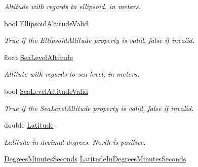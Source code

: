 \begin{DoxyCompactItemize}
\begin{DoxyCompactList}\small\item\em Altitude with regards to ellipsoid, in meters. \item\end{DoxyCompactList}\item 
bool \hyperlink{class_g_p_s_mobile_1_1_gps_position_aed0b8f9f01766832588f42446cef6208}{EllipsoidAltitudeValid}
\begin{DoxyCompactList}\small\item\em True if the EllipsoidAltitude property is valid, false if invalid. \item\end{DoxyCompactList}\item 
float \hyperlink{class_g_p_s_mobile_1_1_gps_position_a132616cda8bc6677dc7cdc22bf4a0c79}{SeaLevelAltitude}
\begin{DoxyCompactList}\small\item\em Altitute with regards to sea level, in meters. \item\end{DoxyCompactList}\item 
bool \hyperlink{class_g_p_s_mobile_1_1_gps_position_aae4f11b97d318dd8d6a67dba91eabb5e}{SeaLevelAltitudeValid}
\begin{DoxyCompactList}\small\item\em True if the SeaLevelAltitude property is valid, false if invalid. \item\end{DoxyCompactList}\item 
double \hyperlink{class_g_p_s_mobile_1_1_gps_position_a165e63838ebfe0e712c142f7a757dad6}{Latitude}
\begin{DoxyCompactList}\small\item\em Latitude in decimal degrees. North is positive. \item\end{DoxyCompactList}\item 
\hyperlink{class_g_p_s_mobile_1_1_degrees_minutes_seconds}{DegreesMinutesSeconds} \hyperlink{class_g_p_s_mobile_1_1_gps_position_abb8229583c518e399546f791d221666d}{LatitudeInDegreesMinutesSeconds}

\end{DoxyCompactItemize}
